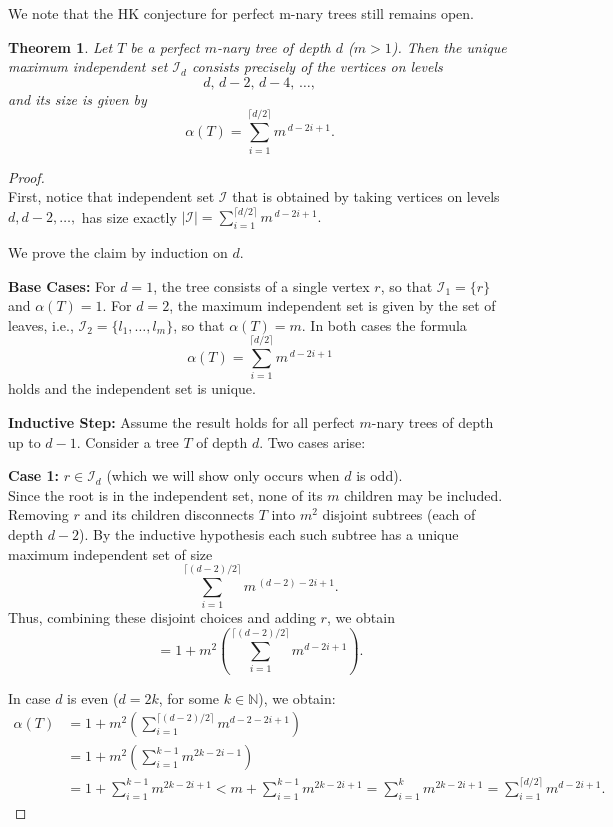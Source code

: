 \documentclass{amsart}
\newtheorem{theorem}{Theorem}[section]
\theoremstyle{definition}
\newcommand\II{{\mathcal I}}
\begin{document}
We note that the HK conjecture for perfect m-nary trees still remains open.

\begin{theorem}{\label{theorem:mnary_independence_num}}
	Let $T$ be a perfect $m$-nary tree of depth $d$ ($m>1$). Then the unique maximum independent set $\mathcal{I}_d$ consists precisely of the vertices on levels
	\[
		d,\, d-2,\, d-4,\, \dots,
	\]
	and its size is given by
	\[
		\alpha(T)=\sum_{i=1}^{\lceil d/2 \rceil} m^{\,d-2i+1}.
	\]
\end{theorem}

\begin{proof}
	$ $
	\\
        First, notice that independent set $\II$ that is obtained by taking vertices on levels $d, d-2, \ldots, $ has size exactly $|\II|=\displaystyle{\sum_{i=1}^{\lceil d/2 \rceil} m^{\,d-2i+1}}.$
        
	We prove the claim by induction on $d$.

	\textbf{Base Cases:}
	For $d=1$, the tree consists of a single vertex $r$, so that $\mathcal{I}_1=\{r\}$ and $\alpha(T)=1$. For $d=2$, the maximum independent set is given by the set of leaves, i.e., $\mathcal{I}_2=\{l_1,\dots,l_m\}$, so that $\alpha(T)=m$. In both cases the formula
	\[
		\alpha(T)=\sum_{i=1}^{\lceil d/2 \rceil} m^{\,d-2i+1}
	\]
	holds and the independent set is unique.

	\medskip

	\textbf{Inductive Step:}
	Assume the result holds for all perfect $m$-nary trees of depth up to $d - 1$. Consider a tree $T$ of depth $d$. Two cases arise:

	\medskip

	\textbf{Case 1:} $r\in \mathcal{I}_{d}$ (which we will show only occurs when $d$ is odd).\\[1mm]
	Since the root is in the independent set, none of its $m$ children may be included. Removing $r$ and its children disconnects $T$ into $m^2$ disjoint subtrees (each of depth $d-2$). By the inductive hypothesis each such subtree has a unique maximum independent set of size
	\[
		\sum_{i=1}^{\lceil (d-2)/2 \rceil} m^{\, (d-2)-2i+1}.
	\]
	Thus, combining these disjoint choices and adding $r$, we obtain
	\[
		= 1 + m^2\left(\sum_{i=1}^{\lceil (d-2)/2 \rceil} m^{d-2i+1}\right).
	\]

        In case $d$ is even ($d = 2k$, for some $k \in \mathbb{N}$), we obtain:
	\begin{align*}
		\alpha(T) & = 1 + m^2\left(\sum_{i=1}^{\lceil (d-2)/2 \rceil} m^{d - 2 -2i+1}\right) \\
		& = 1 + m^2\left(\sum_{i=1}^{k-1} m^{2k-2i-1}\right) \\
		& = 1 + \sum_{i=1}^{k-1} m^{2k-2i+1} < m + \sum_{i=1}^{k-1} m^{2k-2i+1} = \sum_{i=1}^{k} m^{2k-2i+1} = \sum_{i = 1}^{\lceil d/2 \rceil}m^{d-2i+1}.
	\end{align*}


\end{proof}
\end{document}
